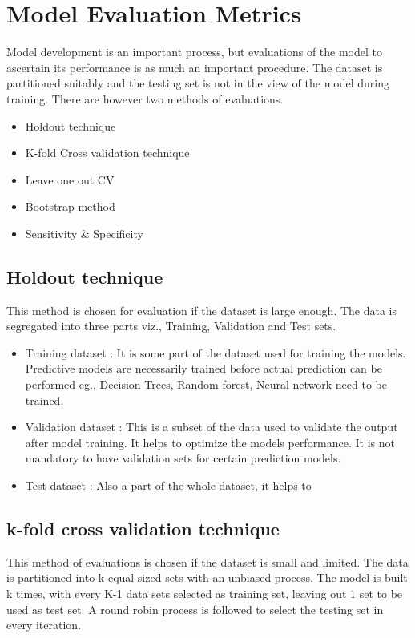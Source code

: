 \newpage
\section{Model Evaluation Metrics}
Model development is an important process, but evaluations of the model to ascertain its performance is as much an important procedure. The dataset is partitioned suitably and the testing set is not in the view of the model during training. There are however two methods of evaluations.

\begin{itemize}
	\item Holdout technique
	\item K-fold Cross validation technique
	\item Leave one out CV
	\item Bootstrap method
	\item Sensitivity \& Specificity
\end{itemize}

\subsection{Holdout technique}
This method is chosen for evaluation if the dataset is large enough. The data is segregated into three parts viz., Training, Validation and Test sets. 
\begin{itemize}
	\item Training dataset : It is some part of the dataset used for training the models. Predictive models are necessarily trained before actual prediction can be performed eg., Decision Trees, Random forest, Neural network need to be trained.
	\item Validation dataset : This is a subset of the data used to validate the output after model training. It helps to optimize the models performance. It is not mandatory to have validation sets for certain prediction models.
	\item Test dataset : Also a part of the whole dataset, it helps to  
\end{itemize}

\subsection{k-fold cross validation technique}
This method of evaluations is chosen if the dataset is small and limited. The data is partitioned into k equal sized sets with an unbiased process. The model is built k times, with every K-1 data sets selected as training set, leaving out 1 set to be used as test set. A round robin process is followed to select the testing set in every iteration.


